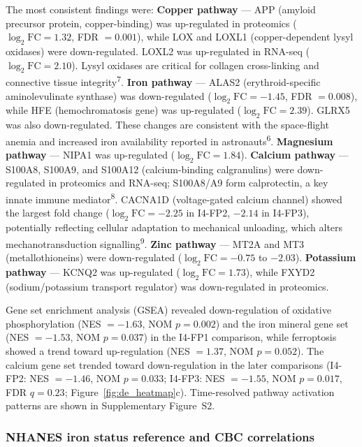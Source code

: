 \documentclass[11pt,a4paper]{article}
\begin{document}
The most consistent findings were: \textbf{Copper pathway} --- APP (amyloid precursor protein, copper-binding) was up-regulated in proteomics ($\log_2\text{FC} = 1.32$, FDR $= 0.001$), while LOX and LOXL1 (copper-dependent lysyl oxidases) were down-regulated. LOXL2 was up-regulated in RNA-seq ($\log_2\text{FC} = 2.10$). Lysyl oxidases are critical for collagen cross-linking and connective tissue integrity\textsuperscript{7}. \textbf{Iron pathway} --- ALAS2 (erythroid-specific aminolevulinate synthase) was down-regulated ($\log_2\text{FC} = -1.45$, FDR $= 0.008$), while HFE (hemochromatosis gene) was up-regulated ($\log_2\text{FC} = 2.39$). GLRX5 was also down-regulated. These changes are consistent with the space-flight anemia and increased iron availability reported in astronauts\textsuperscript{6}. \textbf{Magnesium pathway} --- NIPA1 was up-regulated ($\log_2\text{FC} = 1.84$). \textbf{Calcium pathway} --- S100A8, S100A9, and S100A12 (calcium-binding calgranulins) were down-regulated in proteomics and RNA-seq; S100A8/A9 form calprotectin, a key innate immune mediator\textsuperscript{8}. CACNA1D (voltage-gated calcium channel) showed the largest fold change ($\log_2\text{FC} = -2.25$ in I4-FP2, $-2.14$ in I4-FP3), potentially reflecting cellular adaptation to mechanical unloading, which alters mechanotransduction signalling\textsuperscript{9}. \textbf{Zinc pathway} --- MT2A and MT3 (metallothioneins) were down-regulated ($\log_2\text{FC} = -0.75$ to $-2.03$). \textbf{Potassium pathway} --- KCNQ2 was up-regulated ($\log_2\text{FC} = 1.73$), while FXYD2 (sodium/potassium transport regulator) was down-regulated in proteomics.

Gene set enrichment analysis (GSEA) revealed down-regulation of oxidative phosphorylation (NES $= -1.63$, NOM $p = 0.002$) and the iron mineral gene set (NES $= -1.53$, NOM $p = 0.037$) in the I4-FP1 comparison, while ferroptosis showed a trend toward up-regulation (NES $= 1.37$, NOM $p = 0.052$). The calcium gene set trended toward down-regulation in the later comparisons (I4-FP2: NES $= -1.46$, NOM $p = 0.033$; I4-FP3: NES $= -1.55$, NOM $p = 0.017$, FDR $q = 0.23$; Figure~\ref{fig:de_heatmap}c). Time-resolved pathway activation patterns are shown in Supplementary Figure~S2.

\subsubsection{NHANES iron status reference and CBC correlations}
\end{document}
